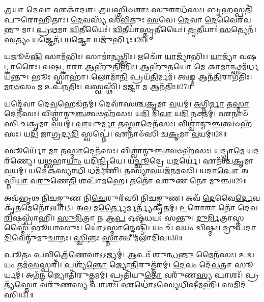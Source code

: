 \-\ul{𑌤𑍍𑌰}\-𑌯𑌾 \ul{𑌦𑍇}\-𑌵𑌾 𑌏𑌕𑌾᳴𑌦𑌶।
\-\ul{𑌤𑍍𑌰}\-\-\ul{𑌯}\-\-\ul{𑌸𑍍𑌤𑍍𑌰𑌿}\-\-\ul{𑍞}\-𑌶𑌾𑌃 \ul{𑌸𑍁}\-𑌰𑌾𑌧᳴𑌸𑌃।
𑌬𑍃\-\ul{𑌹}\-𑌸𑍍𑌪𑌤𑌿᳴𑌪𑍁𑌰𑍋\-𑌹𑌿𑌤𑌾𑌃।
\-\ul{𑌦𑍇}\-𑌵𑌸𑍍𑌯᳴ 𑌸\-\ul{𑌵𑌿}\-𑌤𑍁𑌃 \ul{𑌸}\-𑌵𑍇।
\-\ul{𑌦𑍇}\-𑌵𑌾 \ul{𑌦𑍇}\-𑌵𑍈𑌰᳴𑌵𑌨𑍍𑌤𑍁 𑌮𑌾।
\-\ul{𑌪𑍍𑌰}\-\-\ul{𑌥}\-𑌮𑌾 \ul{𑌦𑍍𑌵𑌿}\-𑌤𑍀𑌯𑍈𑌃॑।
\-\ul{𑌦𑍍𑌵𑌿}\-𑌤𑍀𑌯𑌾॑\-\ul{𑌸𑍍𑌤𑍃}\-𑌤𑍀𑌯𑍈𑌃॑।
\-\ul{𑌤𑍃}\-𑌤𑍀𑌯𑌾𑌃॑ \ul{𑌸}\-𑌤𑍍𑌯𑍇𑌨᳴।
\-\ul{𑌸}\-𑌤𑍍𑌯𑌂 \ul{𑌯}\-𑌜𑍍𑌞𑍇𑌨᳴।
\-\ul{𑌯}\-𑌜𑍍𑌞𑍋 𑌯𑌜𑍁᳴𑌰𑍍𑌭𑌿𑌃॥26॥

𑌯𑌜𑍂𑍞᳴\-\ul{𑌷𑌿} 𑌸𑌾𑌮᳴𑌭𑌿𑌃।
𑌸𑌾𑌮𑌾॑\-\ul{𑌨𑍍𑌯𑍃}\-𑌗𑍍𑌭𑌿𑌃।
𑌋𑌚𑍋᳴ \ul{𑌯𑌾}\-𑌜𑍍𑌯𑌾᳴𑌭𑌿𑌃।
\-\ul{𑌯𑌾}\-𑌜𑍍𑌯𑌾᳴ 𑌵𑌷\-\ul{𑌟𑍍𑌕𑌾}\-𑌰𑍈𑌃।
\-\ul{𑌵}\-\-\ul{𑌷}\-\-\ul{𑌟𑍍𑌕𑌾}\-𑌰𑌾 𑌆𑌹𑍁᳴𑌤𑌿𑌭𑌿𑌃।
𑌆𑌹𑍁᳴𑌤𑌯𑍋 \ul{𑌮𑍇} 𑌕𑌾\-\ul{𑌮𑌾}\-𑌨𑍍𑌥𑍍𑌸𑌮᳴𑌰𑍍𑌧𑌯𑌨𑍍𑌤𑍁।
𑌭𑍂𑌃 𑌸𑍍𑌵𑌾𑌹𑌾॑।
𑌲𑍋𑌮𑌾᳴\-\ul{𑌨𑌿} 𑌪𑍍𑌰𑌯᳴\-\ul{𑌤𑌿}\-𑌰𑍍𑌮𑌮᳴।
𑌤𑍍𑌵\-\ul{𑌙𑍍𑌮} 𑌆𑌨᳴\-\ul{𑌤𑌿}\-𑌰𑌾𑌗᳴𑌤𑌿𑌃।
\-\ul{𑌮𑌾}\-\-\ul{𑍞}\-𑌸𑌂 \ul{𑌮} 𑌉𑌪᳴𑌨𑌤𑌿𑌃।
𑌵𑌸𑍍𑌵𑌸𑍍𑌥𑌿᳴।
\-\ul{𑌮}\-𑌜𑍍𑌜𑌾 \ul{𑌮} 𑌆𑌨᳴𑌤𑌿𑌃॥27॥\anuvakamend[\-\ul{𑌪}\-𑌸𑍍𑌤𑍍𑌯𑌾॑𑌸𑍍𑌵𑌾 𑌸𑌰᳴𑌸𑍍𑌵\-\ul{𑌤𑍍𑌯𑍈} 𑌭𑍈𑌷᳴𑌜𑍍𑌯𑍇\-\ul{𑌨} 𑌶𑍍𑌰𑍀𑌰𑌙𑍍𑌗𑌾᳴𑌨𑌿 \ul{𑌭}\-𑌸\-\ul{𑌦𑍍𑌯}\-𑌜𑍍𑌞𑍇 \ul{𑌯}\-𑌜𑍍𑌞𑍋 𑌯𑌜𑍁᳴\-\ul{𑌰𑍍𑌭𑌿}\-𑌰𑍁𑌪᳴𑌨\-\ul{𑌤𑌿}\-𑌰𑍍𑌦𑍍𑌵𑍇 𑌚᳴]

𑌯𑌦𑍍𑌦𑍇᳴𑌵𑌾 𑌦𑍇\-\ul{𑌵}\-𑌹𑍇𑌡᳴𑌨𑌮𑍍।
𑌦𑍇𑌵𑌾᳴𑌸𑌶𑍍𑌚\-\ul{𑌕𑍃}\-𑌮𑌾 \ul{𑌵}\-𑌯𑌮𑍍।
\-\ul{𑌅}\-𑌗𑍍𑌨𑌿\-\ul{𑌰𑍍𑌮𑌾} 𑌤\-\ul{𑌸𑍍𑌮𑌾}\-𑌦𑍇𑌨᳴𑌸𑌃।
𑌵𑌿𑌶𑍍𑌵𑌾॑𑌨𑍍𑌮𑍁\-\ul{𑌞𑍍𑌚}\-𑌤𑍍𑌵𑍞𑌹᳴𑌸𑌃।
𑌯\-\ul{𑌦𑌿} 𑌦𑌿\-\ul{𑌵𑌾} 𑌯\-\ul{𑌦𑌿} 𑌨𑌕𑍍𑌤𑌮𑍍॑।
𑌏𑌨𑌾𑍞᳴𑌸𑌿 𑌚\-\ul{𑌕𑍃}\-𑌮𑌾 \ul{𑌵}\-𑌯𑌮𑍍।
\-\ul{𑌵𑌾}\-𑌯𑍁\-\ul{𑌰𑍍𑌮𑌾} 𑌤\-\ul{𑌸𑍍𑌮𑌾}\-𑌦𑍇𑌨᳴𑌸𑌃।
𑌵𑌿𑌶𑍍𑌵𑌾॑𑌨𑍍𑌮𑍁\-\ul{𑌞𑍍𑌚}\-𑌤𑍍𑌵𑍞𑌹᳴𑌸𑌃।
𑌯\-\ul{𑌦𑌿} 𑌜𑌾\-\ul{𑌗𑍍𑌰}\-𑌦𑍍𑌯\-\ul{𑌦𑌿} 𑌸𑍍𑌵𑌪𑍍𑌨𑍇॑।
𑌏𑌨𑌾𑍞᳴𑌸𑌿 𑌚\-\ul{𑌕𑍃}\-𑌮𑌾 \ul{𑌵}\-𑌯𑌮𑍍॥28॥

𑌸𑍂𑌰𑍍𑌯𑍋᳴ \ul{𑌮𑌾} 𑌤\-\ul{𑌸𑍍𑌮𑌾}\-𑌦𑍇𑌨᳴𑌸𑌃।
𑌵𑌿𑌶𑍍𑌵𑌾॑𑌨𑍍𑌮𑍁\-\ul{𑌞𑍍𑌚}\-𑌤𑍍𑌵𑍞𑌹᳴𑌸𑌃।
𑌯𑌦𑍍𑌗𑍍𑌰𑌾\-\ul{𑌮𑍇} 𑌯𑌦𑌰᳴𑌣𑍍𑌯𑍇।
𑌯\-\ul{𑌥𑍍𑌸}\-𑌭𑌾\-\ul{𑌯𑌾𑌂} 𑌯𑌦𑌿᳴\-\ul{𑌨𑍍𑌦𑍍𑌰𑌿}\-𑌯𑍇।
𑌯\-\ul{𑌚𑍍𑌛𑍂}\-𑌦𑍍𑌰𑍇 𑌯\-\ul{𑌦}\-𑌰𑍍𑌯𑍇॑।
𑌏𑌨᳴𑌶𑍍𑌚\-\ul{𑌕𑍃}\-𑌮𑌾 \ul{𑌵}\-𑌯𑌮𑍍।
𑌯𑌦𑍇\-\ul{𑌕}\-𑌸𑍍𑌯𑌾\-\ul{𑌧𑌿} 𑌧𑌰𑍍𑌮᳴𑌣𑌿।
𑌤𑌸𑍍𑌯𑌾᳴\-\ul{𑌵}\-𑌯𑌜᳴𑌨𑌮𑌸𑌿।
𑌯𑌦𑌾\-\ul{𑌪𑍋} 𑌅𑌘𑍍𑌨𑌿᳴\-\ul{𑌯𑌾} 𑌵\-\ul{𑌰𑍁}\-𑌣𑍇\-\ul{𑌤𑌿} 𑌶𑌪𑌾᳴𑌮𑌹𑍇।
𑌤𑌤𑍋᳴ 𑌵𑌰𑍁𑌣 𑌨𑍋 𑌮𑍁𑌞𑍍𑌚॥29॥

𑌅𑌵᳴𑌭𑍃𑌥 𑌨𑌿𑌚𑌙𑍍𑌕𑍁𑌣 𑌨𑌿\-\ul{𑌚𑍇}\-𑌰𑍁𑌰᳴𑌸𑌿 𑌨𑌿𑌚𑌙𑍍𑌕𑍁𑌣।
𑌅𑌵᳴ \ul{𑌦𑍇}\-𑌵𑍈\-\ul{𑌰𑍍𑌦𑍇}\-𑌵𑌕𑍃᳴\-\ul{𑌤}\-𑌮𑍇𑌨𑍋᳴\-𑌽𑌯𑌾𑌟𑍍।
𑌅\-\ul{𑌵} 𑌮\-\ul{𑌰𑍍𑌤𑍍𑌯𑍈}\-𑌰𑍍𑌮𑌰𑍍𑌤𑍍𑌯᳴𑌕𑍃𑌤𑌮𑍍।
\-\ul{𑌉}\-𑌰𑍋𑌰𑌾 𑌨𑍋᳴ 𑌦𑍇𑌵 \ul{𑌰𑌿}\-𑌷𑌸𑍍𑌪𑌾᳴𑌹𑌿।
\-\ul{𑌸𑍁}\-\-\ul{𑌮𑌿}\-𑌤𑍍𑌰𑌾 \ul{𑌨} 𑌆\-\ul{𑌪} 𑌓𑌷᳴𑌧𑌯𑌃 𑌸𑌨𑍍𑌤𑍁।
\-\ul{𑌦𑍁}\-\-\ul{𑌰𑍍𑌮𑌿}\-𑌤𑍍𑌰𑌾𑌸𑍍𑌤𑌸𑍍𑌮𑍈᳴ 𑌭𑍂𑌯𑌾𑌸𑍁𑌃।
𑌯𑍋॑𑌽𑌸𑍍𑌮𑌾𑌨𑍍𑌦𑍍𑌵𑍇𑌷𑍍𑌟𑌿᳴।
𑌯𑌂 𑌚᳴ \ul{𑌵}\-𑌯𑌂 \ul{𑌦𑍍𑌵𑌿}\-𑌷𑍍𑌮𑌃।
\-\ul{𑌦𑍍𑌰𑍁}\-\-\ul{𑌪}\-𑌦𑌾\-\ul{𑌦𑌿}\-𑌵𑍇𑌨𑍍𑌮𑍁᳴𑌮𑍁\-\ul{𑌚𑌾}\-𑌨𑌃।
\-\ul{𑌸𑍍𑌵𑌿}\-𑌨𑍍𑌨𑌃 \ul{𑌸𑍍𑌨𑌾}\-𑌤𑍍𑌵𑍀 𑌮𑌲𑌾᳴𑌦𑌿𑌵॥30॥

\-\ul{𑌪𑍂}\-𑌤𑌂 \ul{𑌪}\-𑌵𑌿𑌤𑍍𑌰𑍇᳴\-\ul{𑌣𑍇}\-𑌵𑌾𑌽𑌽𑌜𑍍𑌯𑌮𑍍॑।
𑌆𑌪𑌃᳴ 𑌶𑍁𑌨𑍍𑌧\-\ul{𑌨𑍍𑌤𑍁} 𑌮𑍈𑌨᳴𑌸𑌃।
𑌉\-\ul{𑌦𑍍𑌵}\-𑌯𑌂 𑌤𑌮᳴\-\ul{𑌸}\-𑌸𑍍𑌪𑌰𑌿᳴।
𑌪𑌶𑍍𑌯᳴\-\ul{𑌨𑍍𑌤𑍋} 𑌜𑍍𑌯𑍋\-\ul{𑌤𑌿}\-𑌰𑍁𑌤𑍍𑌤᳴𑌰𑌮𑍍।
\-\ul{𑌦𑍇}\-𑌵𑌂 𑌦𑍇᳴\-\ul{𑌵}\-𑌤𑍍𑌰𑌾 𑌸𑍂𑌰𑍍𑌯𑌮𑍍॑।
𑌅𑌗᳴\-\ul{𑌨𑍍𑌮} 𑌜𑍍𑌯𑍋𑌤𑌿᳴𑌰𑍁\-\ul{𑌤𑍍𑌤}\-𑌮𑌮𑍍।
𑌪𑍍𑌰𑌤𑌿᳴\-𑌯𑍁\-\ul{𑌤𑍋} 𑌵𑌰𑍁᳴𑌣\-\ul{𑌸𑍍𑌯} 𑌪𑌾𑌶𑌃᳴।
𑌪𑍍𑌰𑌤𑍍𑌯᳴\-\ul{𑌸𑍍𑌤𑍋} 𑌵𑌰𑍁᳴𑌣\-\ul{𑌸𑍍𑌯} 𑌪𑌾𑌶𑌃᳴।
𑌏𑌧𑍋॑𑌽𑌸𑍍𑌯𑍇𑌧𑌿\-\ul{𑌷𑍀}\-𑌮𑌹𑌿᳴।
\-\ul{𑌸}\-𑌮𑌿𑌦᳴𑌸𑌿॥31॥

